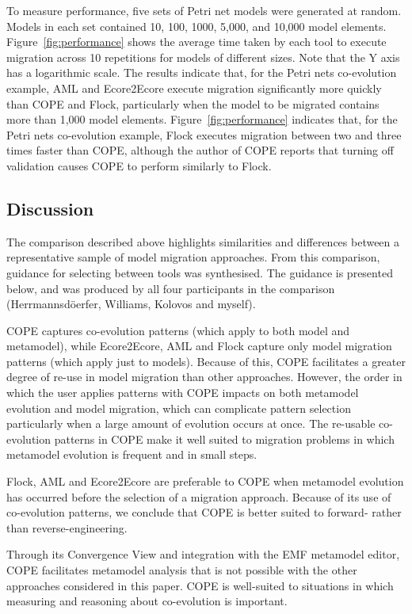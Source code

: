 To measure performance, five sets of Petri net models were generated at random. Models in each set contained 10, 100, 1000, 5,000, and 10,000 model elements.  Figure~\ref{fig:performance} shows the average time taken by each tool to execute migration across 10 repetitions for models of different sizes. Note that the Y axis has a logarithmic scale. The results indicate that, for the Petri nets co-evolution example, AML and Ecore2Ecore execute migration significantly more quickly than COPE and Flock, particularly when the model to be migrated contains more than 1,000 model elements. Figure~\ref{fig:performance} indicates that, for the Petri nets co-evolution example, Flock executes migration between two and three times faster than COPE, although the author of COPE reports that turning off validation causes COPE to perform similarly to Flock.


\subsection{Discussion}
\label{sec:discussion}
The comparison described above highlights similarities and differences between a representative sample of model migration approaches. From this comparison, guidance for selecting between tools was synthesised. The guidance is presented below, and was produced by all four participants in the comparison (Herrmannsd\"{o}erfer, Williams, Kolovos and myself). 

COPE captures co-evolution patterns (which apply to both model and metamodel), while Ecore2Ecore, AML and Flock capture only model migration patterns (which apply just to models). Because of this, COPE facilitates a greater degree of re-use in model migration than other approaches. However, the order in which the user applies patterns with COPE impacts on both metamodel evolution and model migration, which can complicate pattern selection particularly when a large amount of evolution occurs at once. The re-usable co-evolution patterns in COPE make it well suited to migration problems in which metamodel evolution is frequent and in small steps.

Flock, AML and Ecore2Ecore are preferable to COPE when metamodel evolution has occurred before the selection of a migration approach. Because of its use of co-evolution patterns, we conclude that COPE is better suited to forward- rather than reverse-engineering.

Through its Convergence View and integration with the EMF metamodel editor, COPE facilitates metamodel analysis that is not possible with the other approaches considered in this paper. COPE is well-suited to situations in which measuring and reasoning about co-evolution is important.

